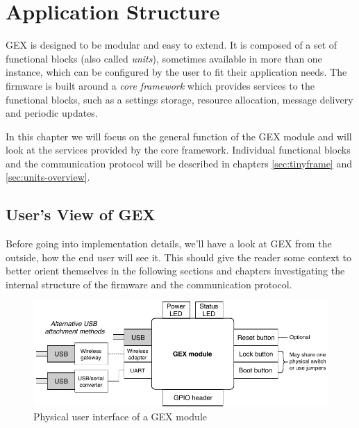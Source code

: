\chapter{Application Structure}

GEX is designed to be modular and easy to extend. It is composed of a set of functional blocks (also called \textit{units}), sometimes available in more than one instance, which can be configured by the user to fit their application needs. The firmware is built around a \textit{core framework} which provides services to the functional blocks, such as a settings storage, resource allocation, message delivery and periodic updates.

In this chapter we will focus on the general function of the GEX module and will look at the services provided by the core framework. Individual functional blocks and the communication protocol will be described in chapters \ref{sec:tinyframe} and \ref{sec:units-overview}.

\section{User's View of GEX} 

Before going into implementation details, we'll have a look at GEX from the outside, how the end user will see it. This should give the reader some context to better orient themselves in the following sections and chapters investigating the internal structure of the firmware and the communication protocol.

\begin{figure}[h]
	\centering
	\includegraphics[scale=.95] {img/users-view.pdf}
	\caption{\label{fig:users-view-of-gex}Physical user interface of a GEX module}
\end{figure}

